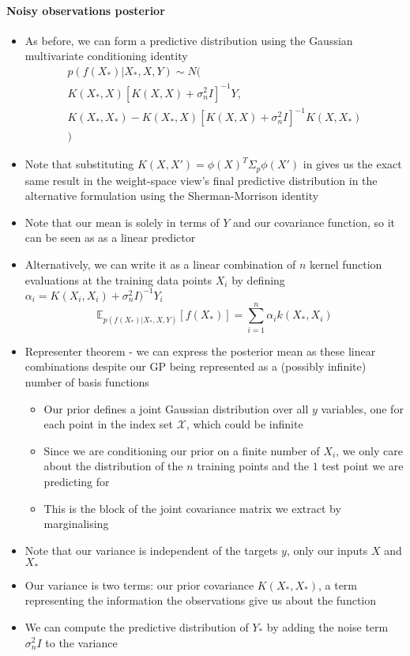 \documentclass[12pt]{article}
\begin{document}
\paragraph{Noisy observations posterior}
\begin{itemize}
    \item As before, we can form a predictive distribution using the Gaussian multivariate conditioning identity
\begin{equation}
    \begin{aligned}
        p(f(X_*)|X_*, X, Y) \sim N( \\
        K(X_*,X)[K(X,X) + \sigma^2_nI]^{-1}Y, \\
        K(X_*,X_*) - K(X_*,X)[K(X,X) + \sigma^2_nI]^{-1}K(X,X_*) \\
        )
    \end{aligned}
\end{equation}
    \item Note that substituting $K(X,X') = \phi(X)^T\Sigma_p\phi(X')$ in gives us the exact same result in the weight-space view's final predictive distribution in the alternative formulation using the Sherman-Morrison identity
    \item Note that our mean is solely in terms of $Y$ and our covariance function, so it can be seen as as a linear predictor
    \item Alternatively, we can write it as a linear combination of $n$ kernel function evaluations at the training data points $X_i$ by defining $\alpha_i = K(X_i, X_i) + \sigma_n^2I)^{-1}Y_i$
\begin{equation}
    \mathbb{E}_{p(f(X_*)|X_*,X,Y)}[f(X_*)] = \sum_{i=1}^n \alpha_i k(X_*, X_i)
\end{equation}
    \item Representer theorem - we can express the posterior mean as these linear combinations despite our GP being represented as a (possibly infinite) number of basis functions
    \begin{itemize}
        \item Our prior defines a joint Gaussian distribution over all $y$ variables, one for each point in the index set $\mathcal{X}$, which could be infinite
        \item Since we are conditioning our prior on a finite number of $X_i$, we only care about the distribution of the $n$ training points and the $1$ test point we are predicting for
        \item This is the block of the joint covariance matrix we extract by marginalising
    \end{itemize}
    \item Note that our variance is independent of the targets $y$, only our inputs $X$ and $X_*$
    \item Our variance is two terms: our prior covariance $K(X_*,X_*)$, a term representing the information the observations give us about the function
    \item We can compute the predictive distribution of $Y_*$ by adding the noise term $\sigma^2_nI$ to the variance
\end{itemize}
\end{document}
